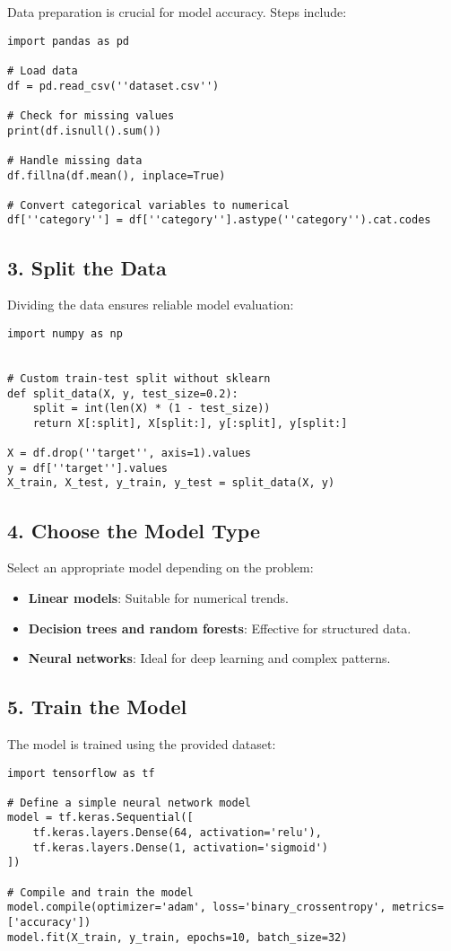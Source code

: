 Data preparation is crucial for model accuracy. Steps include:
\begin{verbatim}
import pandas as pd

# Load data
df = pd.read_csv(''dataset.csv'')

# Check for missing values
print(df.isnull().sum())

# Handle missing data
df.fillna(df.mean(), inplace=True)

# Convert categorical variables to numerical
df[''category''] = df[''category''].astype(''category'').cat.codes
\end{verbatim}

\subsection{3. Split the Data}

Dividing the data ensures reliable model evaluation:
\begin{verbatim}
import numpy as np


# Custom train-test split without sklearn
def split_data(X, y, test_size=0.2):
    split = int(len(X) * (1 - test_size))
    return X[:split], X[split:], y[:split], y[split:]

X = df.drop(''target'', axis=1).values
y = df[''target''].values
X_train, X_test, y_train, y_test = split_data(X, y)
\end{verbatim}

\subsection{4. Choose the Model Type}

Select an appropriate model depending on the problem:
\begin{itemize}
    \item \textbf{Linear models}: Suitable for numerical trends.
    \item \textbf{Decision trees and random forests}: Effective for structured data.
    \item \textbf{Neural networks}: Ideal for deep learning and complex patterns.
\end{itemize}

\subsection{5. Train the Model}

The model is trained using the provided dataset:
\begin{verbatim}
import tensorflow as tf

# Define a simple neural network model
model = tf.keras.Sequential([
    tf.keras.layers.Dense(64, activation='relu'),
    tf.keras.layers.Dense(1, activation='sigmoid')
])

# Compile and train the model
model.compile(optimizer='adam', loss='binary_crossentropy', metrics=['accuracy'])
model.fit(X_train, y_train, epochs=10, batch_size=32)
\end{verbatim}

